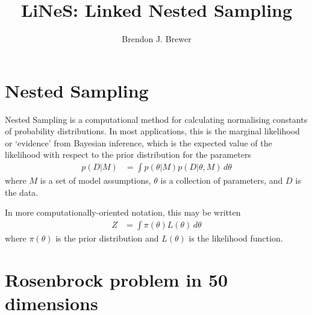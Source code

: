 \documentclass[a4paper, 12pt]{article}
\title{LiNeS: Linked Nested Sampling}
\author{Brendon J. Brewer}
\date{}
\begin{document}
\maketitle


\setlength{\parindent}{0pt}
\setlength{\parskip}{8pt}

\section{Nested Sampling}
Nested Sampling \citep{skilling2006nested}
is a computational method for calculating normalising
constants of probability distributions. In most applications, this is
the marginal likelihood or `evidence' from Bayesian inference, which is
the expected value of the likelihood with respect to the prior distribution
for the parameters
\begin{align}
p(D | M) &= \int p(\theta | M) p(D | \theta, M) \, d\theta
\end{align}
where $M$ is a set of model assumptions, $\theta$ is a collection of
parameters, and $D$ is the data.

In more computationally-oriented notation, this may be written
\begin{align}
Z &= \int \pi(\theta)L(\theta) \, d\theta
\end{align}
where $\pi(\theta)$ is the prior distribution and $L(\theta)$ is the
likelihood function.




\section{Rosenbrock problem in 50 dimensions}
\end{document}
